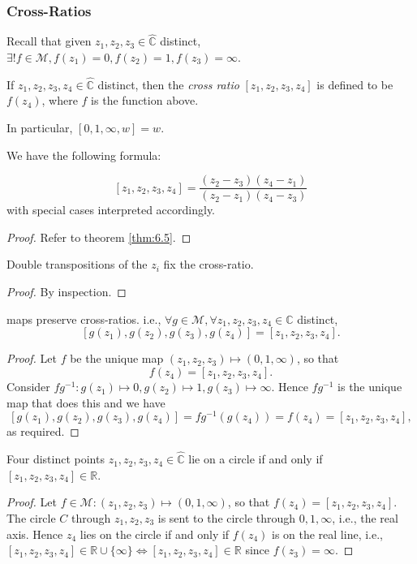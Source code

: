 \documentclass[a4paper]{article}
\begin{document}
\subsubsection{Cross-Ratios}
Recall that given $z_1,z_2,z_3 \in \hat{\mathbb{C}}$ distinct, $
\exists !f\in \mathcal{M}, f(z_1)=0, f(z_2)=1,f(z_3)=\infty  $.
\begin{definition}
  If $z_1,z_2,z_3,z_4 \in \hat{\mathbb{C}}$ distinct, then the
  \textit{cross ratio} $ [z_1,z_2,z_3,z_4] $ is defined to be
  $f(z_4)$, where $f$ is the function above.

  In particular, $ [0,1,\infty,w]=w $.
\end{definition}
We have the following formula:
\begin{proposition}
  \[
    [z_1,z_2,z_3,z_4] = \frac{(z_2-z_3)(z_4-z_1)}{(z_2-z_1)(z_4-z_3)}
  \]
  with special cases interpreted accordingly.
\end{proposition}
\begin{proof}
  Refer to theorem \ref{thm:6.5}.
\end{proof}
\begin{proposition}\label{prop:6.10}
  Double transpositions of the $z_i$ fix the cross-ratio.
\end{proposition}
\begin{proof}
  By inspection.
\end{proof}
\begin{theorem}\label{thm:6.11}
  \mobius maps preserve cross-ratios. i.e., $ \forall g\in
  \mathcal{M}, \forall z_1,z_2,z_3,z_4\in \hat{\mathbb{C}} $ distinct,
  \[
    [g(z_1),g(z_2),g(z_3),g(z_4)]=[z_1,z_2,z_3,z_4].
  \]
\end{theorem}
\begin{proof}
  Let $f$ be the unique \mobius map $ (z_1,z_2,z_3)\mapsto
  (0,1,\infty ) $, so that
  \[
    f(z_4)=[z_1,z_2,z_3,z_4].
  \]
  Consider $ fg^{-1}: g(z_1)\mapsto 0,g(z_2)\mapsto 1,g(z_3)\mapsto
  \infty  $. Hence $fg^{-1}$ is the unique map that does this and we have
  \[
    [g(z_1),g(z_2),g(z_3),g(z_4)] = fg^{-1}(g(z_4))=f(z_4)=[z_1,z_2,z_3,z_4],
  \]
  as required.
\end{proof}
\begin{corollary}\label{col:6.12}
  Four distinct points $z_1,z_2,z_3,z_4\in \hat{\mathbb{C}}$ lie on a
  circle if and only if $[z_1,z_2,z_3,z_4]\in \mathbb{R}$.
\end{corollary}
\begin{proof}
  Let $f\in \mathcal{M}: (z_1,z_2,z_3)\mapsto (0,1,\infty )$, so that
  $ f(z_4)=[z_1,z_2,z_3,z_4] $. The circle $C$ through $z_1,z_2,z_3$
  is sent to the circle through $0,1,\infty$, i.e., the real axis.
  Hence $z_4$ lies on the circle if and only if $f(z_4)$ is on the
  real line, i.e., $[z_1,z_2,z_3,z_4]\in \mathbb{R} \cup \{\infty\}
  \Leftrightarrow [z_1,z_2,z_3,z_4]\in \mathbb{R}$ since $f(z_3)=\infty$.
\end{proof}
\end{document}
